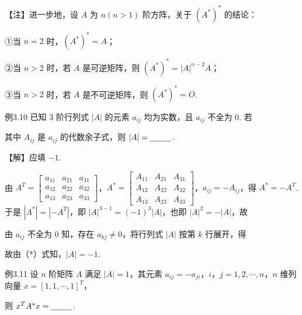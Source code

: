 \begin{fnote}
【注】进一步地，设 $A$ 为 $n(n>1)$ 阶方阵，关于 $(A^*)^*$ 的结论：

①当 $n=2$ 时，$(A^*)^*=A$；

②当 $n>2$ 时，若 $A$ 是可逆矩阵，则 $(A^*)^*=|A|^{n-2}A$；

③当 $n>2$ 时，若 $A$ 是不可逆矩阵，则 $(A^*)^*=O$.
\end{fnote}

\begin{fcard}{例3.10}
已知 3 阶行列式 $|A|$ 的元素 $a_{ij}$ 均为实数，且 $a_{ij}$ 不全为 0. 若


其中 $A_{ij}$ 是 $a_{ij}$ 的代数余子式，则 $|A|=\underline{\hspace{2.6em}}$.
\end{fcard}

【解】应填 $-1$.

由 $A^{T}=\begin{bmatrix}a_{11}&a_{21}&a_{31}\\a_{12}&a_{22}&a_{32}\\a_{13}&a_{23}&a_{33}\end{bmatrix}$，$A^*=\begin{bmatrix}A_{11}&A_{21}&A_{31}\\A_{12}&A_{22}&A_{32}\\A_{13}&A_{23}&A_{33}\end{bmatrix}$，$a_{ij}=-A_{ij}$，得 $A^*=-A^{T}$. 于是 $|A^*|=|-A^{T}|$，即 $|A|^{3-1}=(-1)^{3}|A|$，也即 $|A|^{2}=-|A|$，故


由 $a_{ij}$ 不全为 0 知，存在 $a_{kj}\ne0$，将行列式 $|A|$ 按第 $k$ 行展开，得


故由（$*$）式知，$|A|=-1$.

\begin{fcard}{例3.11}
设 $n$ 阶矩阵 $A$ 满足 $|A|=1$，其元素 $a_{ij}=-a_{ji}$，$i$，$j=1,2,\cdots,n$，$n$ 维列向量 $x=[1,1,\cdots,1]^{T}$，

则 $x^{T}A^*x=\underline{\hspace{2.6em}}$.
\end{fcard}

